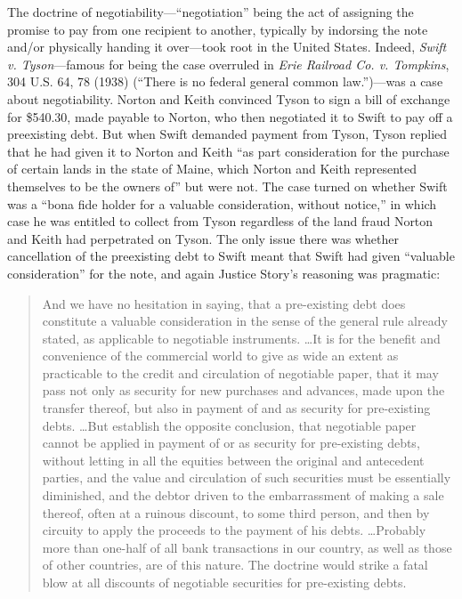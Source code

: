 The doctrine of negotiability---``negotiation'' being the act of assigning the
promise to pay from one recipient to another, typically by indorsing the note
and/or physically handing it over---took root in the United States. Indeed,
\textit{Swift v. Tyson}---famous for being the case overruled in \textit{Erie
Railroad Co. v. Tompkins}, 304 U.S. 64, 78 (1938) (``There is no federal
general common law.'')---was a case about negotiability. Norton and Keith
convinced Tyson to sign a bill of exchange for \$540.30, made payable to
Norton, who then negotiated it to Swift to pay off a preexisting debt. But when
Swift demanded payment from Tyson, Tyson replied that he had given it to Norton
and Keith ``as part consideration for the purchase of certain lands in the
state of Maine, which Norton and Keith represented themselves to be the owners
of'' but were not. The case turned on whether Swift was a ``bona fide holder
for a valuable consideration, without notice,'' in which case he was entitled
to collect from Tyson regardless of the land fraud Norton and Keith had
perpetrated on Tyson. The only issue there was whether cancellation of the
preexisting debt to Swift meant that Swift had given ``valuable consideration''
for the note, and again Justice Story's reasoning was pragmatic:
\begin{quote}
And we have no hesitation in saying, that a pre-existing debt does constitute a
valuable consideration in the sense of the general rule already stated, as
applicable to negotiable instruments. \ldots It is for the benefit and
convenience of the commercial world to give as wide an extent as practicable to
the credit and circulation of negotiable paper, that it may pass not only as
security for new purchases and advances, made upon the transfer thereof, but
also in payment of and as security for pre-existing debts. \ldots But
establish the opposite conclusion, that negotiable paper cannot be applied in
payment of or as security for pre-existing debts, without letting in all the
equities between the original and antecedent parties, and the value and
circulation of such securities must be essentially diminished, and the debtor
driven to the embarrassment of making a sale thereof, often at a ruinous
discount, to some third person, and then by circuity to apply the proceeds to
the payment of his debts. \ldots Probably more than one-half of all bank
transactions in our country, as well as those of other countries, are of this
nature. The doctrine would strike a fatal blow at all discounts of negotiable
securities for pre-existing debts.
\end{quote}
